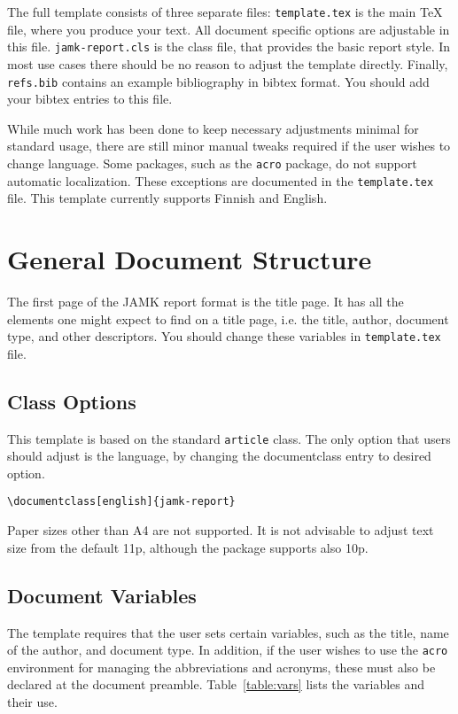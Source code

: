 \documentclass[english]{jamk-report}
\begin{document}
The full template consists of three separate files: \texttt{template.tex}
is the main TeX file, where you produce your text. All document specific
options are adjustable in this file. \texttt{jamk-report.cls}
is the class file, that provides the basic report style. In most use cases there should be
no reason to adjust the template directly. Finally, \texttt{refs.bib} contains
an example bibliography in bibtex format. You should add your bibtex entries to this file.

While much work has been done to keep necessary adjustments minimal for
standard usage, there are still minor manual tweaks required if the user
wishes to change language. Some packages, such as the \texttt{acro} package,
do not support automatic localization. These exceptions are documented in the
\texttt{template.tex} file. This template currently supports Finnish and English.


\section{General Document Structure}

The first page of the JAMK report format is the title page. It has all the
elements one might expect to find on a title page, i.e. the title, author,
document type, and other descriptors. You should change these variables
in \texttt{template.tex} file.

\subsection{Class Options}

This template is based on the standard \texttt{article} class. The only option
that users should adjust is the language, by changing the documentclass entry
to desired option.

\begin{verbatim}
\documentclass[english]{jamk-report}
\end{verbatim}

\noindent
Paper sizes other than A4 are not supported. It is not advisable to adjust text
size from the default 11p, although the package supports also 10p.

\subsection{Document Variables}

The template requires that the user sets certain variables, such as the title,
name of the author, and document type. In addition, if the user wishes to use
the \texttt{acro} environment for managing the abbreviations and acronyms, these
must also be declared at the document preamble. Table~\ref{table:vars} lists
the variables and their use.
\end{document}
